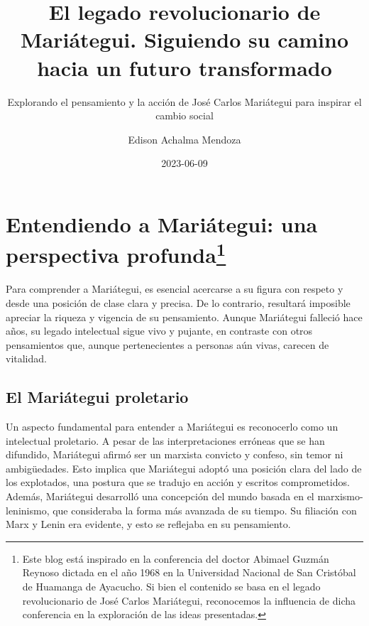 \documentclass[
  letterpaper,
  DIV=11,
  numbers=noendperiod]{scrartcl}
\title{El legado revolucionario de Mariátegui. Siguiendo su camino hacia
un futuro transformado}
\subtitle{Explorando el pensamiento y la acción de José Carlos
Mariátegui para inspirar el cambio social}
\author{Edison Achalma Mendoza}
\date{2023-06-09}
\begin{document}
\maketitle
\ifdefined\Shaded\renewenvironment{Shaded}{\begin{tcolorbox}[frame hidden, borderline west={3pt}{0pt}{shadecolor}, boxrule=0pt, enhanced, sharp corners, interior hidden, breakable]}{\end{tcolorbox}}\fi

\hypertarget{entendiendo-a-mariuxe1tegui-una-perspectiva-profunda}{%
\section[Entendiendo a Mariátegui: una perspectiva
profunda]{\texorpdfstring{Entendiendo a Mariátegui: una perspectiva
profunda\footnote{Este blog está inspirado en la conferencia del doctor
  Abimael Guzmán Reynoso dictada en el año 1968 en la Universidad
  Nacional de San Cristóbal de Huamanga de Ayacucho. Si bien el
  contenido se basa en el legado revolucionario de José Carlos
  Mariátegui, reconocemos la influencia de dicha conferencia en la
  exploración de las ideas presentadas.}}{Entendiendo a Mariátegui: una perspectiva profunda}}\label{entendiendo-a-mariuxe1tegui-una-perspectiva-profunda}}

Para comprender a Mariátegui, es esencial acercarse a su figura con
respeto y desde una posición de clase clara y precisa. De lo contrario,
resultará imposible apreciar la riqueza y vigencia de su pensamiento.
Aunque Mariátegui falleció hace años, su legado intelectual sigue vivo y
pujante, en contraste con otros pensamientos que, aunque pertenecientes
a personas aún vivas, carecen de vitalidad.

\hypertarget{el-mariuxe1tegui-proletario}{%
\subsection{El Mariátegui
proletario}\label{el-mariuxe1tegui-proletario}}

Un aspecto fundamental para entender a Mariátegui es reconocerlo como un
intelectual proletario. A pesar de las interpretaciones erróneas que se
han difundido, Mariátegui afirmó ser un marxista convicto y confeso, sin
temor ni ambigüedades. Esto implica que Mariátegui adoptó una posición
clara del lado de los explotados, una postura que se tradujo en acción y
escritos comprometidos. Además, Mariátegui desarrolló una concepción del
mundo basada en el marxismo-leninismo, que consideraba la forma más
avanzada de su tiempo. Su filiación con Marx y Lenin era evidente, y
esto se reflejaba en su pensamiento.
\end{document}
